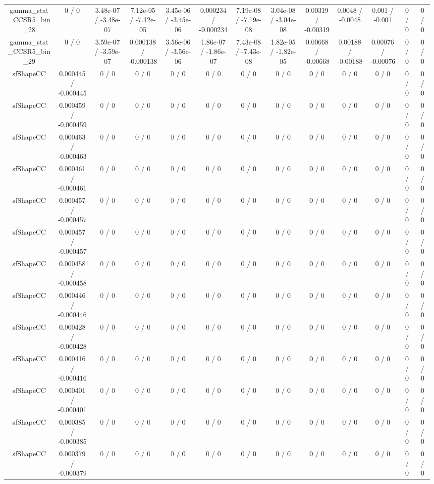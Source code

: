 \documentclass[10pt]{article}
\begin{document}
\begin{table}[htbp]
\begin{center}
\begin{tabular}{|c|c|c|c|c|c|c|c|c|c|c|c|c|}
  gamma_stat_CCSR5_bin_28 & 0 / 0 & 3.48e-07 / -3.48e-07 & 7.12e-05 / -7.12e-05 & 3.45e-06 / -3.45e-06 & 0.000234 / -0.000234 & 7.19e-08 / -7.19e-08 & 3.04e-08 / -3.04e-08 & 0.00319 / -0.00319 & 0.0048 / -0.0048 & 0.001 / -0.001 & 0 / 0 & 0 / 0 \\ 
  gamma_stat_CCSR5_bin_29 & 0 / 0 & 3.59e-07 / -3.59e-07 & 0.000138 / -0.000138 & 3.56e-06 / -3.56e-06 & 1.86e-07 / -1.86e-07 & 7.43e-08 / -7.43e-08 & 1.82e-05 / -1.82e-05 & 0.00668 / -0.00668 & 0.00188 / -0.00188 & 0.00076 / -0.00076 & 0 / 0 & 0 / 0 \\ 
  sfShapeCC & 0.000445 / -0.000445 & 0 / 0 & 0 / 0 & 0 / 0 & 0 / 0 & 0 / 0 & 0 / 0 & 0 / 0 & 0 / 0 & 0 / 0 & 0 / 0 & 0 / 0 \\ 
  sfShapeCC & 0.000459 / -0.000459 & 0 / 0 & 0 / 0 & 0 / 0 & 0 / 0 & 0 / 0 & 0 / 0 & 0 / 0 & 0 / 0 & 0 / 0 & 0 / 0 & 0 / 0 \\ 
  sfShapeCC & 0.000463 / -0.000463 & 0 / 0 & 0 / 0 & 0 / 0 & 0 / 0 & 0 / 0 & 0 / 0 & 0 / 0 & 0 / 0 & 0 / 0 & 0 / 0 & 0 / 0 \\ 
  sfShapeCC & 0.000461 / -0.000461 & 0 / 0 & 0 / 0 & 0 / 0 & 0 / 0 & 0 / 0 & 0 / 0 & 0 / 0 & 0 / 0 & 0 / 0 & 0 / 0 & 0 / 0 \\ 
  sfShapeCC & 0.000457 / -0.000457 & 0 / 0 & 0 / 0 & 0 / 0 & 0 / 0 & 0 / 0 & 0 / 0 & 0 / 0 & 0 / 0 & 0 / 0 & 0 / 0 & 0 / 0 \\ 
  sfShapeCC & 0.000457 / -0.000457 & 0 / 0 & 0 / 0 & 0 / 0 & 0 / 0 & 0 / 0 & 0 / 0 & 0 / 0 & 0 / 0 & 0 / 0 & 0 / 0 & 0 / 0 \\ 
  sfShapeCC & 0.000458 / -0.000458 & 0 / 0 & 0 / 0 & 0 / 0 & 0 / 0 & 0 / 0 & 0 / 0 & 0 / 0 & 0 / 0 & 0 / 0 & 0 / 0 & 0 / 0 \\ 
  sfShapeCC & 0.000446 / -0.000446 & 0 / 0 & 0 / 0 & 0 / 0 & 0 / 0 & 0 / 0 & 0 / 0 & 0 / 0 & 0 / 0 & 0 / 0 & 0 / 0 & 0 / 0 \\ 
  sfShapeCC & 0.000428 / -0.000428 & 0 / 0 & 0 / 0 & 0 / 0 & 0 / 0 & 0 / 0 & 0 / 0 & 0 / 0 & 0 / 0 & 0 / 0 & 0 / 0 & 0 / 0 \\ 
  sfShapeCC & 0.000416 / -0.000416 & 0 / 0 & 0 / 0 & 0 / 0 & 0 / 0 & 0 / 0 & 0 / 0 & 0 / 0 & 0 / 0 & 0 / 0 & 0 / 0 & 0 / 0 \\ 
  sfShapeCC & 0.000401 / -0.000401 & 0 / 0 & 0 / 0 & 0 / 0 & 0 / 0 & 0 / 0 & 0 / 0 & 0 / 0 & 0 / 0 & 0 / 0 & 0 / 0 & 0 / 0 \\ 
  sfShapeCC & 0.000385 / -0.000385 & 0 / 0 & 0 / 0 & 0 / 0 & 0 / 0 & 0 / 0 & 0 / 0 & 0 / 0 & 0 / 0 & 0 / 0 & 0 / 0 & 0 / 0 \\ 
  sfShapeCC & 0.000379 / -0.000379 & 0 / 0 & 0 / 0 & 0 / 0 & 0 / 0 & 0 / 0 & 0 / 0 & 0 / 0 & 0 / 0 & 0 / 0 & 0 / 0 & 0 / 0 \\ 

\end{tabular}
\end{center}
\end{table}
\end{document}
